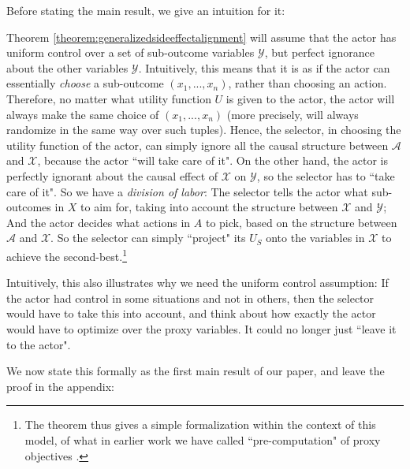 Before stating the main result, we give an intuition for it:
\begin{intuition*}
	\textnormal {Theorem \ref{theorem:generalizedsideeffectalignment} will assume that the actor has uniform control over a set of sub-outcome variables $\mathcal Y$, but perfect ignorance about the other variables $\mathcal Y$. Intuitively, this means that it is as if the actor can essentially \textit{choose} a sub-outcome $(x_1,...,x_n)$, rather than choosing an action. Therefore, no matter what utility function $U$ is given to the actor, the actor will always make the same choice of $(x_1,...,x_n)$ (more precisely, will always randomize in the same way over such tuples). Hence, the selector, in choosing the utility function of the actor, can simply ignore all the causal structure between $\mathcal A$ and $\mathcal X$, because the actor ``will take care of it". On the other hand, the actor is perfectly ignorant about the causal effect of $\mathcal X$ on $\mathcal Y$, so the selector has to ``take care of it". So we have a \textit{division of labor}: The selector tells the actor what sub-outcomes in $X$ to aim for, taking into account the structure between $\mathcal X$ and $\mathcal Y$; And the actor decides what actions in $A$ to pick, based on the structure between $\mathcal A$ and $\mathcal X$. So the selector can simply ``project" its $U_S$ onto the variables in $\mathcal X$ to achieve the second-best.\footnote{The theorem thus gives a simple formalization within the context of this model, of what in earlier work we have called ``pre-computation" of proxy objectives \citep{Hubinger2019}.} }

	\textnormal{Intuitively, this also illustrates why we need the uniform control assumption: If the actor had control in some situations and not in others, then the selector would have to take this into account, and think about how exactly the actor would have to optimize over the proxy variables. It could no longer just ``leave it to the actor". }
\end{intuition*}



We now state this formally as the first main result of our paper, and leave the proof in the appendix:

